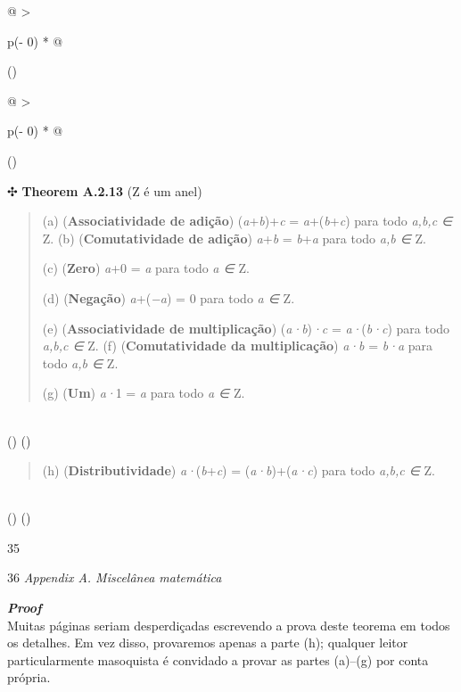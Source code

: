 \documentclass[
]{article}
\begin{document}
\begin{longtable}[]{@{}
  >{\raggedright\arraybackslash}p{(\columnwidth - 0\tabcolsep) * }@{}}
\toprule()
\begin{minipage}[b]{\linewidth}\raggedright
\begin{longtable}[]{@{}
  >{\raggedright\arraybackslash}p{(\columnwidth - 0\tabcolsep) * }@{}}
\toprule()
\begin{minipage}[b]{\linewidth}\raggedright
✣ \textbf{Theorem A.2.13} (Z é um anel)

\begin{quote}
(a) (\textbf{Associatividade de adição}) (\emph{a}+\emph{b})+\emph{c} =
\emph{a}+(\emph{b}+\emph{c}) para todo \emph{a,b,c ∈} Z. (b)
(\textbf{Comutatividade de adição}) \emph{a}+\emph{b} =
\emph{b}+\emph{a} para todo \emph{a,b ∈} Z.

(c) (\textbf{Zero}) \emph{a}+0 = \emph{a} para todo \emph{a ∈} Z.

(d) (\textbf{Negação}) \emph{a}+(\emph{−a}) = 0 para todo \emph{a ∈} Z.

(e) (\textbf{Associatividade de multiplicação}) (\emph{a·b})\emph{·c} =
\emph{a·}(\emph{b·c}) para todo \emph{a,b,c ∈} Z. (f)
(\textbf{Comutatividade da multiplicação}) \emph{a·b} = \emph{b·a} para
todo \emph{a,b ∈} Z.

(g) (\textbf{Um}) \emph{a·}1 = \emph{a} para todo \emph{a ∈} Z.
\end{quote}
\end{minipage} \\
\midrule()
\endhead
\bottomrule()
\end{longtable}

\begin{quote}
(h) (\textbf{Distributividade}) \emph{a·}(\emph{b}+\emph{c}) =
(\emph{a·b})+(\emph{a·c}) para todo \emph{a,b,c ∈} Z.
\end{quote}
\end{minipage} \\
\midrule()
\endhead
\bottomrule()
\end{longtable}

35

36 \emph{Appendix A. Miscelânea matemática}

\emph{\textbf{Proof}}\\
Muitas páginas seriam desperdiçadas escrevendo a prova deste teorema em
todos os detalhes. Em vez disso, provaremos apenas a parte (h); qualquer
leitor particularmente masoquista é convidado a provar as partes
(a)--(g) por conta própria.
\end{document}

